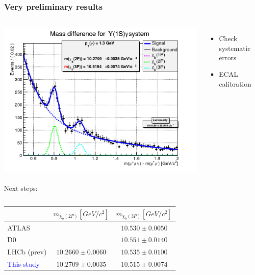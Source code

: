 \documentclass{beamer}
\begin{document}
\begin{frame}[t]
\frametitle{Very preliminary results}
\begin{columns}[T]
\includegraphics[height=.4\textheight]{images/m3p.png}\\~\\
Next steps:

\begin{itemize}
  \item Check systematic errors
  \item ECAL calibration
\end{itemize}
\end{columns}
\begin{tabular}{|l|c|c|}\hline
              &  $m_{\chi_b(2P)} [GeV/c^2]$ & $m_{\chi_b(3P)} [GeV/c^2]$\\ \hline
ATLAS         &                             & $10.530 \pm 0.0050$\\
D0            &                             & $10.551 \pm 0.0140$\\
LHCb (prev)   &  $10.2660 \pm 0.0060$       & $10.535 \pm 0.0100$\\ \hline
\textcolor{blue}{This study} & $10.2709 \pm 0.0035$ & $10.515 \pm 0.0074$ \\ \hline
\end{tabular}
\end{frame}
\end{document}
